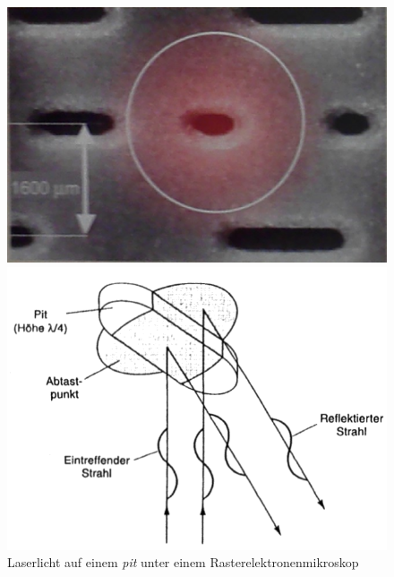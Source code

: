 \begin{figure}[h]
    \begin{center}
        \begin{minipage}[t]{0.3\textwidth}
            \begin{center}
                \includegraphics[height=0.1\textheight]{Bilder/Optische_Datentraeger_Die_Compact_Disc/Funktionsweise/remcd.png}
                \caption[Laserlicht auf einem \textit{pit} unter einem Rasterelektronenmikroskop \newline Roth, Klaus: CD, DVD \& Co.: Die Chemie der schillernden Scheiben, in: Chemie in unserer Zeit (41/2007), S. 340]{Laserlicht auf einem \textit{pit} unter einem Rasterelektronenmikroskop}
                \label{fig:cdrem}
            \end{center}
        \end{minipage}
        \hspace{0.025\textwidth}
        \begin{minipage}[t]{0.3\textwidth}
            \begin{center}
                \includegraphics[height=0.1\textheight]{Bilder/Optische_Datentraeger_Die_Compact_Disc/Funktionsweise/cdlaser.png}

\end{center}
\end{minipage}
\end{center}
\end{figure}

